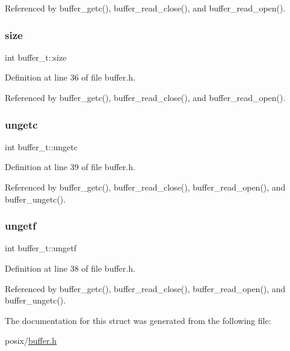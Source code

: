 Referenced by buffer\+\_\+getc(), buffer\+\_\+read\+\_\+close(), and buffer\+\_\+read\+\_\+open().

\mbox{\label{structbuffer__t_a34e81d898c6accf4f06ed9c1133d6361}} 
\subsubsection{\texorpdfstring{size}{size}}
{\footnotesize\ttfamily int buffer\+\_\+t\+::size}



Definition at line 36 of file buffer.\+h.



Referenced by buffer\+\_\+getc(), buffer\+\_\+read\+\_\+close(), and buffer\+\_\+read\+\_\+open().

\mbox{\label{structbuffer__t_aa1fbbf42ce5d6278b21a93647bef3ff1}} 
\subsubsection{\texorpdfstring{ungetc}{ungetc}}
{\footnotesize\ttfamily int buffer\+\_\+t\+::ungetc}



Definition at line 39 of file buffer.\+h.



Referenced by buffer\+\_\+getc(), buffer\+\_\+read\+\_\+close(), buffer\+\_\+read\+\_\+open(), and buffer\+\_\+ungetc().

\mbox{\label{structbuffer__t_a67c2edddeca1858c670ff57e049a9e0e}} 
\subsubsection{\texorpdfstring{ungetf}{ungetf}}
{\footnotesize\ttfamily int buffer\+\_\+t\+::ungetf}



Definition at line 38 of file buffer.\+h.



Referenced by buffer\+\_\+getc(), buffer\+\_\+read\+\_\+close(), buffer\+\_\+read\+\_\+open(), and buffer\+\_\+ungetc().



The documentation for this struct was generated from the following file\+:\begin{DoxyCompactItemize}
\item 
posix/\hyperlink{buffer_8h}{buffer.\+h}\end{DoxyCompactItemize}
